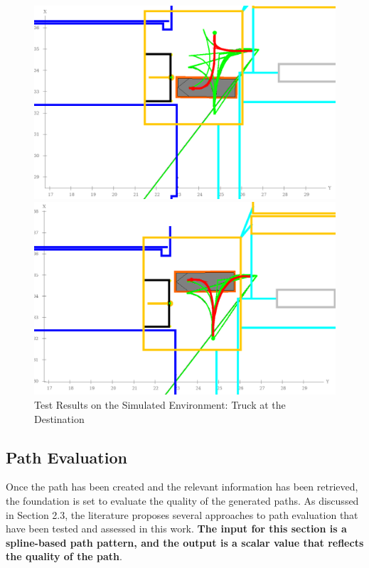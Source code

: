 \begin{figure}[H]
    \centering
    \begin{minipage}{0.45\textwidth}
        \centering
        \includegraphics[width=\linewidth]{images/Chap2/Pattern_spline_simulation_1.png} %
    \end{minipage}
    \begin{minipage}{0.45\textwidth}
        \centering
        \includegraphics[width=\linewidth]{images/Chap2/Pattern_spline_simulation_2.png} %
    \end{minipage}
    \caption{Test Results on the Simulated Environment: Truck at the Destination}
    \label{Test_Simu}
\end{figure}

\subsection{Path Evaluation}
Once the path has been created and the relevant information has been retrieved, the foundation is set to evaluate the 
quality of the generated paths. As discussed in Section 2.3, the literature proposes several approaches to path evaluation 
that have been tested and assessed in this work. \textbf{The input for this section is a spline-based path pattern, and the 
output is a scalar value that reflects the quality of the path}.


